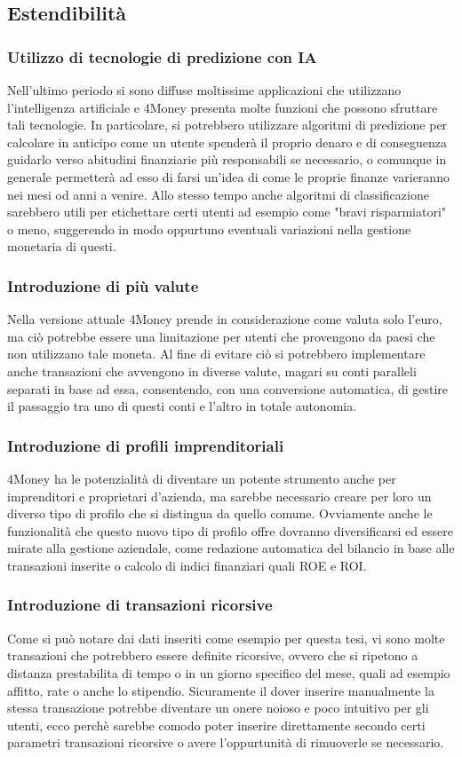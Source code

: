 \documentclass[binding=0.6cm, oneside, noexaminfo, italian]{sapthesis}
\begin{document}
\subsection{Estendibilità}
\subsubsection{Utilizzo di tecnologie di predizione con IA}
Nell'ultimo periodo si sono diffuse moltissime applicazioni che utilizzano l'intelligenza artificiale e 4Money presenta molte funzioni che possono sfruttare tali tecnologie. In particolare, si potrebbero utilizzare algoritmi di predizione per calcolare in anticipo come un utente spenderà il proprio denaro e di conseguenza guidarlo verso abitudini finanziarie più responsabili se necessario, o comunque in generale permetterà ad esso di farsi un'idea di come le proprie finanze varieranno nei mesi od anni a venire. Allo stesso tempo anche algoritmi di classificazione sarebbero utili per etichettare certi utenti ad esempio come "bravi risparmiatori" o meno, suggerendo in modo oppurtuno eventuali variazioni nella gestione monetaria di questi.
\subsubsection{Introduzione di più valute}
Nella versione attuale 4Money prende in considerazione come valuta solo l'euro, ma ciò potrebbe essere una limitazione per utenti che provengono da paesi che non utilizzano tale moneta. Al fine di evitare ciò si potrebbero implementare anche transazioni che avvengono in diverse valute, magari su conti paralleli separati in base ad essa, consentendo, con una conversione automatica, di gestire il passaggio tra uno di questi conti e l'altro in totale autonomia.
\subsubsection{Introduzione di profili imprenditoriali}
4Money ha le potenzialità di diventare un potente strumento anche per imprenditori e proprietari d'azienda, ma sarebbe necessario creare per loro un diverso tipo di profilo che si distingua da quello comune. Ovviamente anche le funzionalità che questo nuovo tipo di profilo offre dovranno diversificarsi ed essere mirate alla gestione aziendale, come redazione automatica del bilancio in base alle transazioni inserite o calcolo di indici finanziari quali ROE e ROI.
\subsubsection{Introduzione di transazioni ricorsive}
Come si può notare dai dati inseriti come esempio per questa tesi, vi sono molte transazioni che potrebbero essere definite ricorsive, ovvero che si ripetono a distanza prestabilita di tempo o in un giorno specifico del mese, quali ad esempio affitto, rate o anche lo stipendio. Sicuramente il dover inserire manualmente la stessa transazione potrebbe diventare un onere noioso e poco intuitivo per gli utenti, ecco perchè sarebbe comodo poter inserire direttamente secondo certi parametri transazioni ricorsive o avere l'oppurtunità di rimuoverle se necessario.

\backmatter
\printbibliography
\end{document}
